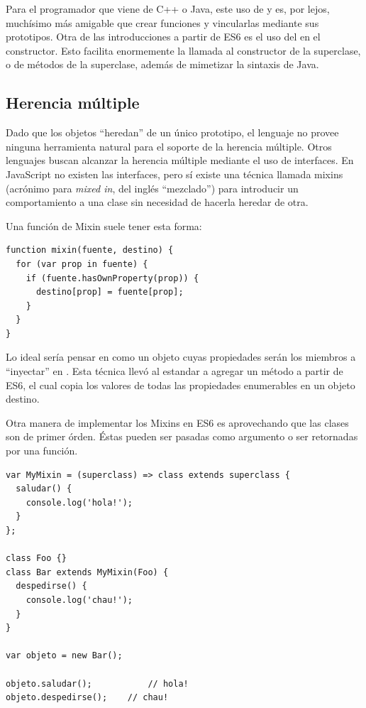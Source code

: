 Para el programador que viene de C++ o Java, este uso de  y  es, por lejos, muchísimo más amigable que crear funciones y vincularlas mediante sus prototipos. Otra de las introducciones a partir de ES6 es el uso del  en el constructor. Esto facilita enormemente la llamada al constructor de la superclase, o de métodos de la superclase, además de mimetizar la sintaxis de Java. 

\subsection{Herencia múltiple}

Dado que los objetos "`heredan"' de un único prototipo, el lenguaje no provee ninguna herramienta natural para el soporte de la herencia múltiple. Otros lenguajes buscan alcanzar la herencia múltiple mediante el uso de interfaces. En JavaScript no existen las interfaces, pero sí existe una técnica llamada mixins (acrónimo para \textit{mixed in}, del inglés "`mezclado"') para introducir un comportamiento a una clase sin necesidad de hacerla heredar de otra.

Una función de Mixin suele tener esta forma:

\begin{lstlisting}[title={Función de Mixin}]
function mixin(fuente, destino) {  
  for (var prop in fuente) {
    if (fuente.hasOwnProperty(prop)) {
      destino[prop] = fuente[prop];
    }
  }
}
\end{lstlisting}

Lo ideal sería pensar en  como un objeto cuyas propiedades serán los miembros a "`inyectar"' en . Esta técnica llevó al estandar a agregar un método  a partir de ES6, el cual copia los valores de todas las propiedades enumerables en un objeto destino.

Otra manera de implementar los Mixins en ES6 es aprovechando que las clases son de primer órden. Éstas pueden ser pasadas como argumento o ser retornadas por una función.

\begin{lstlisting}[title={Haciendo uso de \code{class} como expresión}]
var MyMixin = (superclass) => class extends superclass {  
  saludar() {
    console.log('hola!');
  }
};

class Foo {}
class Bar extends MyMixin(Foo) {
  despedirse() {
    console.log('chau!');
  }
}

var objeto = new Bar();

objeto.saludar();			// hola!
objeto.despedirse();	// chau!
\end{lstlisting}

